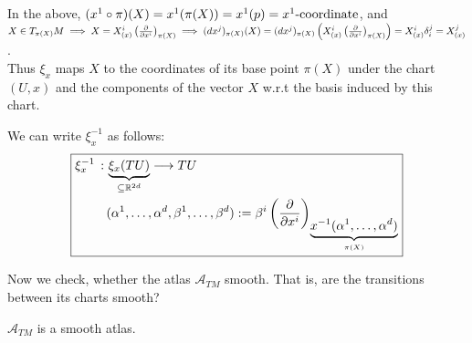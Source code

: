 In the above, $(x^1 \circ \pi)(X) = x^1(\pi(X)) = x^1(p) = x^1 \text{-coordinate}$, and \\
$X \in T_{\pi(X)}M \implies X = X_{(x)}^i \left(\frac{\partial }{\partial x^i}\right)_{\pi(X)} \implies (dx^j)_{\pi(X)}(X) = (dx^j)_{\pi(X)} \left(X^i_{(x)}\left(\frac{\partial }{\partial x^i}\right)_{\pi(X)} \right) = X^i_{(x)}\delta_i^j = X^j_{(x)}$. \\
Thus $\xi_x$ maps $X$ to the coordinates of its base point $\pi(X)$ under the chart $(U,x)$ and the components of the vector $X$ w.r.t the basis induced by this chart.

We can write $\xi_x^{-1}$ as follows:
\begin{equation}\label{eq:xiInverseTangentBundle}
\boxed{
\begin{split}
\xi_x^{-1} \, : \, & \underbrace{\xi_x(TU)}_{\subseteq \mathbb{R}^{2d}} \longrightarrow TU \\
& (\alpha^1, \dotsc, \alpha^d, \beta^1, \dotsc, \beta^d) := \beta^i \left(\frac{\partial }{\partial x^i}\right)_{\underbrace{x^{-1}(\alpha^1, \dotsc, \alpha^d)}_{\pi(X)}}
\end{split}
}
\end{equation}

Now we check, whether the atlas $\mathcal{A}_{TM}$ smooth. That is, are the transitions between its charts smooth?

\begin{theorem}
$\mathcal{A}_{TM}$ is a smooth atlas.
\end{theorem}

